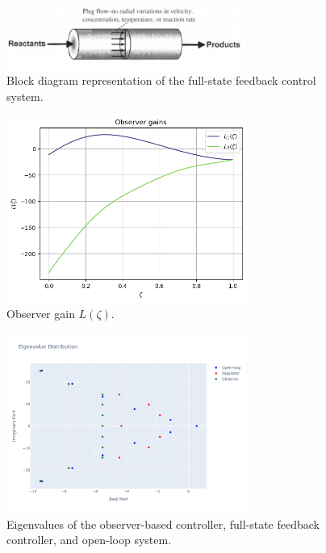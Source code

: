 \begin{figure}[!htbp]
    \centering
    \includegraphics*[width=0.7\textwidth]{Figures/sample.jpeg}
    \caption{Block diagram representation of the full-state feedback control system.}
    \label{fig:block_diagram}
\end{figure}

\begin{figure}[!htbp]
    \centering
    \includegraphics[width=0.7\textwidth]{Figures/L.png}
    \caption{Observer gain $L(\zeta)$.}
    \label{fig:L_modes}
\end{figure}

\begin{figure}[!htbp]
    \centering
    \includegraphics*[width=0.7\textwidth]{Figures/pole_placement.png}
    \caption{Eigenvalues of the observer-based controller, full-state feedback controller, and open-loop system.}
    \label{fig:eigs}
\end{figure}

